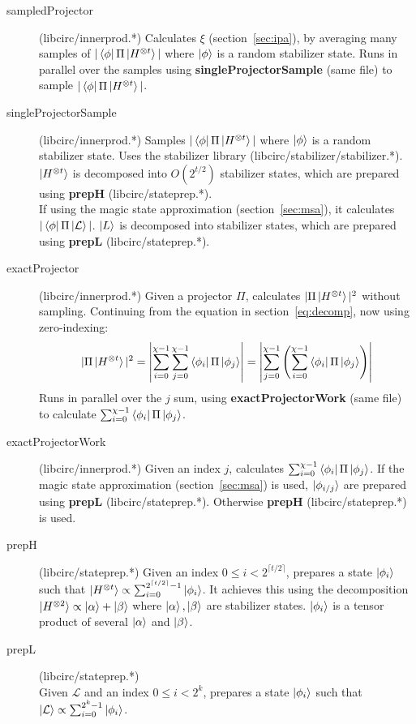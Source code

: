 \documentclass[11pt]{article}
\begin{document}
\begin{description}
    \item[sampledProjector] (libcirc/innerprod.*) Calculates $\xi$ (section~\ref{sec:ipa}), by averaging many samples of $|\bra{\phi}\Pi\ket{H^{\otimes t}}|$ where $\ket{\phi}$ is a random stabilizer state. Runs in parallel over the samples using \textbf{singleProjectorSample} (same file) to sample $|\bra{\phi}\Pi\ket{H^{\otimes t}}|$.
    \item[singleProjectorSample] (libcirc/innerprod.*) Samples $|\bra{\phi}\Pi\ket{H^{\otimes t}}|$ where $\ket{\phi}$ is a random stabilizer state. Uses the stabilizer library (libcirc/stabilizer/stabilizer.*). $\ket{H^{\otimes t}}$ is decomposed into $O(2^{t/2})$ stabilizer states, which are prepared using \textbf{prepH} (libcirc/stateprep.*).\\ If using the magic state approximation (section~\ref{sec:msa}), it calculates $|\bra{\phi}\Pi\ket{\mathcal{L}}|$. $\ket{L}$ is decomposed into stabilizer states, which are prepared using \textbf{prepL} (libcirc/stateprep.*).


    \item[exactProjector] (libcirc/innerprod.*) Given a projector $\Pi$, calculates $|\Pi\ket{H^{\otimes t}}|^2$ without sampling. Continuing from the equation in section~\ref{eq:decomp}, now using zero-indexing:
        $$ |\Pi\ket{H^{\otimes t}}|^2 = \left| \sum^{\chi-1}_{i=0} \sum^{\chi-1}_{j=0}\bra{\phi_i}\Pi\ket{\phi_j}\right| = \left| \sum^{\chi-1}_{j=0}\left(\sum^{\chi-1}_{i=0} \bra{\phi_i}\Pi\ket{\phi_j}\right)\right| $$
        Runs in parallel over the $j$ sum, using \textbf{exactProjectorWork} (same file) to calculate $\sum^{\chi-1}_{i=0} \bra{\phi_i}\Pi\ket{\phi_j}$.

    \item[exactProjectorWork] (libcirc/innerprod.*) Given an index $j$, calculates $\sum^{\chi-1}_{i=0} \bra{\phi_i}\Pi\ket{\phi_j}$. If the magic state approximation (section~\ref{sec:msa}) is used, $\ket{\phi_{i/j}}$ are prepared using \textbf{prepL} (libcirc/stateprep.*). Otherwise \textbf{prepH} (libcirc/stateprep.*) is used.

    \item[prepH] (libcirc/stateprep.*) Given an index $0 \leq i < 2^{\lceil t/2\rceil}$, prepares a state $\ket{\phi_i}$ such that $\ket{H^{\otimes t}} \propto \sum_{i=0}^{2^{\lceil t/2 \rceil}-1} \ket{\phi_i} $. It achieves this using the decomposition $\ket{H^{\otimes 2}} \propto \ket{\alpha} + \ket{\beta}$ where $\ket{\alpha},\ket{\beta}$ are stabilizer states. $\ket{\phi_i}$ is a tensor product of several $\ket{\alpha}$ and $\ket{\beta}$. 
    
    \item[prepL] (libcirc/stateprep.*) \\Given $\mathcal{L}$ and an index $0 \leq i < 2^{ k}$, prepares a state $\ket{\phi_i}$ such that $\ket{\mathcal{L}} \propto \sum_{i=0}^{2^{k}-1} \ket{\phi_i} $. 
  

\end{description}
\end{document}

